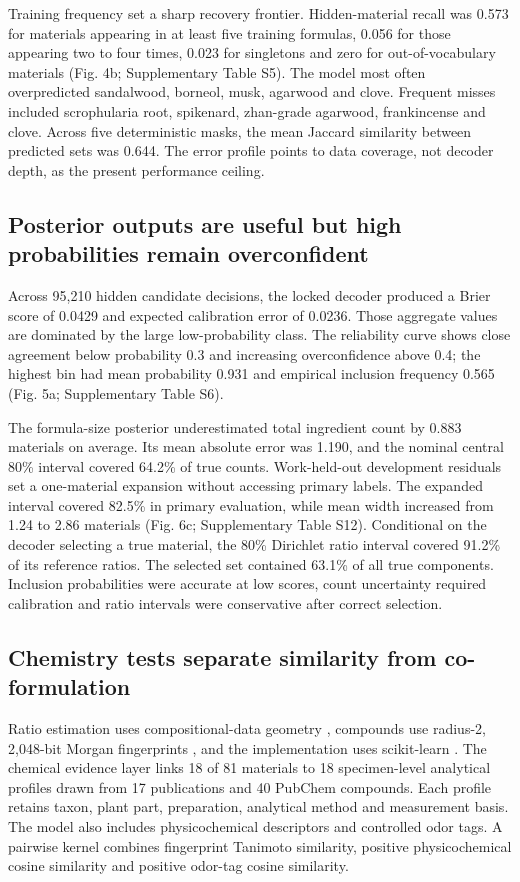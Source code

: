 \documentclass[12pt]{article}
\begin{document}
Training frequency set a sharp recovery frontier. Hidden-material recall was 0.573 for materials appearing in at least five training formulas, 0.056 for those appearing two to four times, 0.023 for singletons and zero for out-of-vocabulary materials (Fig. 4b; Supplementary Table S5). The model most often overpredicted sandalwood, borneol, musk, agarwood and clove. Frequent misses included scrophularia root, spikenard, zhan-grade agarwood, frankincense and clove. Across five deterministic masks, the mean Jaccard similarity between predicted sets was 0.644. The error profile points to data coverage, not decoder depth, as the present performance ceiling.

\subsection*{Posterior outputs are useful but high probabilities remain overconfident}

Across 95,210 hidden candidate decisions, the locked decoder produced a Brier score of 0.0429 and expected calibration error of 0.0236. Those aggregate values are dominated by the large low-probability class. The reliability curve shows close agreement below probability 0.3 and increasing overconfidence above 0.4; the highest bin had mean probability 0.931 and empirical inclusion frequency 0.565 (Fig. 5a; Supplementary Table S6).

The formula-size posterior underestimated total ingredient count by 0.883 materials on average. Its mean absolute error was 1.190, and the nominal central 80\% interval covered 64.2\% of true counts. Work-held-out development residuals set a one-material expansion without accessing primary labels. The expanded interval covered 82.5\% in primary evaluation, while mean width increased from 1.24 to 2.86 materials (Fig. 6c; Supplementary Table S12). Conditional on the decoder selecting a true material, the 80\% Dirichlet ratio interval covered 91.2\% of its reference ratios. The selected set contained 63.1\% of all true components. Inclusion probabilities were accurate at low scores, count uncertainty required calibration and ratio intervals were conservative after correct selection.

\subsection*{Chemistry tests separate similarity from co-formulation}

Ratio estimation uses compositional-data geometry \cite{ref19}, compounds use radius-2, 2,048-bit Morgan fingerprints \cite{ref20}, and the implementation uses scikit-learn \cite{ref21}. The chemical evidence layer links 18 of 81 materials to 18 specimen-level analytical profiles drawn from 17 publications \cite{ref22,ref23,ref24,ref25,ref26,ref27,ref28,ref29,ref30,ref31,ref32,ref33,ref34,ref35,ref36,ref37,ref38} and 40 PubChem compounds. Each profile retains taxon, plant part, preparation, analytical method and measurement basis. The model also includes physicochemical descriptors and controlled odor tags. A pairwise kernel combines fingerprint Tanimoto similarity, positive physicochemical cosine similarity and positive odor-tag cosine similarity.
\end{document}

